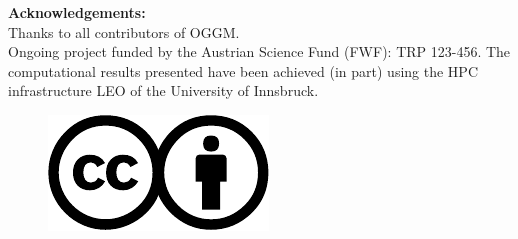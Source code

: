 \documentclass[final]{beamer}
\begin{document}
\begin{frame}[fragile]
\begin{footnotesize}
\begin{minipage}[t]{0.75\textwidth}
		\textbf{Acknowledgements:} \\
		Thanks to all contributors of OGGM.
		\\Ongoing project funded by the Austrian Science Fund (FWF): TRP 123-456.
		The computational results presented have been achieved (in part) using
		the HPC infrastructure LEO of the University of Innsbruck.
	\end{minipage}
	\hfill
	\begin{minipage}[t]{0.05\textwidth}
		\begin{figure}
			\includegraphics[width=\textwidth]{license_ccby}
		\end{figure}
	\end{minipage}
\end{footnotesize}
\end{frame}
\end{document}
